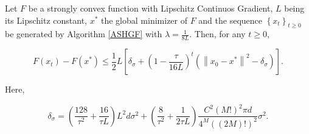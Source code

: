 \begin{thm}\label{DescentBoundThm}

Let $ F $ be a strongly convex function with Lipschitz Continuos Gradient, $L$ being its Lipschitz constant, $x^*$ the global minimizer of $ F $ and the sequence $ \left\{x_{t}\right\}_{t \geq 0} $ be generated by Algorithm \ref{ASHGF} with $ \lambda=\frac{1}{8L} $. Then, for any $ t \geq 0 $,

\begin{equation}\label{DescentBoundEq}
F\left(x_{t}\right)-F\left(x^{*}\right) \leq \frac{1}{2} L\left[\delta_{\sigma}+\left(1-\frac{\tau}{16 L}\right)^{t}\left(\left\|x_{0}-x^{*}\right\|^{2}-\delta_{\sigma}\right)\right] .
\end{equation}

Here,

\begin{equation}\label{DescentBoundThmThings}
\delta_{\sigma}=\left(\frac{128}{\tau^{2}}+\frac{16}{\tau L}\right) L^{2} d \sigma^{2}+\left(\frac{8}{\tau^{2}}+\frac{1}{2 \tau L}\right) \frac{C^{2}(M !)^{2} \pi d}{4^{M}((2 M) !)^{2}} \sigma^{2} .
\end{equation}

\end{thm}

